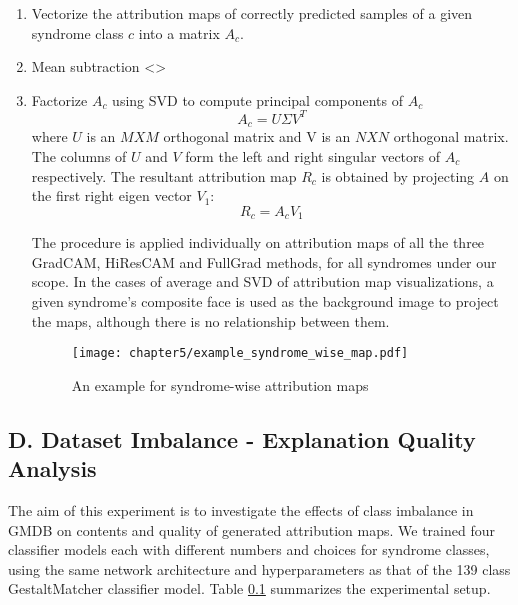 \documentclass[../report.tex]{subfiles}
\begin{document}
	\begin{enumerate}
		\item Vectorize the attribution maps of correctly predicted samples of a given syndrome class $c$ into a matrix $A_{c}$.
		\item Mean subtraction <>
		\item Factorize $A_{c}$ using SVD to compute principal components of $A_{c}$
		\begin{equation}
			A_{c} = U \Sigma {V}^T
		\end{equation}
		where $U$ is an $MXM$ orthogonal matrix and V is an $NXN$ orthogonal matrix.  The columns of $U$ and $V$ form the left and right singular vectors of $A_{c}$ respectively. The resultant attribution map $R_{c}$ is obtained by projecting $A$ on the first right eigen vector $V_{1}$:
		\begin{equation}
			R_{c} = A_{c}V_{1}
		\end{equation}
	
	The procedure is applied individually on attribution maps of all the three GradCAM, HiResCAM and FullGrad methods, for all syndromes under our scope. In the cases of average and SVD of attribution map visualizations, a given syndrome's composite face is used as the background image to project the maps, although there is no relationship between them.
	\begin{figure}[H]
		\hspace*{0cm}      
		\texttt{[image: chapter5/example\_syndrome\_wise\_map.pdf]}
		\caption{An example for syndrome-wise attribution maps}
		\label{fig_synd_maps}
	\end{figure}
	\end{enumerate}    
    \subsection{D. Dataset Imbalance - Explanation Quality Analysis}
    The aim of this experiment is to investigate the effects of class imbalance in GMDB on contents and quality of generated attribution maps. We trained four classifier models each with different numbers and choices for syndrome classes, using the same network architecture and hyperparameters as that of the 139 class GestaltMatcher classifier model. Table \ref{} summarizes the experimental setup.
\end{document}
